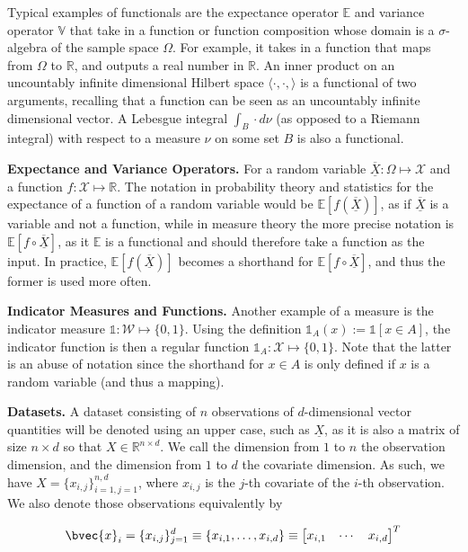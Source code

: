 \documentclass[twoside]{article} \usepackage{aistats2017}
\newcommand{\rv}[1]{\underline{\overline{#1}}}
\begin{document}
	Typical examples of functionals are the expectance operator $\mathbb{E}$ and variance operator $\mathbb{V}$ that take in a function or function composition whose domain is a $\sigma$-algebra of the sample space $\Omega$. For example, it takes in a function that maps from $\Omega$ to $\mathbb{R}$, and outputs a real number in $\mathbb{R}$. An inner product on an uncountably infinite dimensional Hilbert space $\langle \cdot, \cdot, \rangle$ is a functional of two arguments, recalling that a function can be seen as an uncountably infinite dimensional vector. A Lebesgue integral $\int_{B} \cdot d\nu$ (as opposed to a Riemann integral) with respect to a measure $\nu$ on some set $B$ is also a functional.
	
	\textbf{Expectance and Variance Operators.} For a random variable $\rv{X} : \Omega \mapsto \mathcal{X}$ and a function $f : \mathcal{X} \mapsto \mathbb{R}$. The notation in probability theory and statistics for the expectance of a function of a random variable would be $\mathbb{E}[f(\rv{X})]$, as if $\rv{X}$ is a variable and not a function, while in measure theory the more precise notation is $\mathbb{E}[f \circ \rv{X}]$, as it $\mathbb{E}$ is a functional and should therefore take a function as the input. In practice, $\mathbb{E}[f(\rv{X})]$ becomes a shorthand for $\mathbb{E}[f \circ \rv{X}]$, and thus the former is used more often.
	
	\textbf{Indicator Measures and Functions.} Another example of a measure is the indicator measure $\mathbb{1} : \mathcal{W} \mapsto \{0, 1\}$. Using the definition $\mathbb{1}_{A}(x) := \mathbb{1}[x \in A]$, the indicator function is then a regular function $\mathbb{1}_{A} : \mathcal{X} \mapsto \{0, 1\}$. Note that the latter is an abuse of notation since the shorthand for $x \in A$ is only defined if $x$ is a random variable (and thus a mapping). 
	
	\textbf{Datasets.} A dataset consisting of $n$ observations of $d$-dimensional vector quantities will be denoted using an upper case, such as $\underline{X}$, as it is also a matrix of size $n \times d$ so that $X \in \mathbb{R}^{n \times d}$. We call the dimension from $1$ to $n$ the observation dimension, and the dimension from $1$ to $d$ the covariate dimension. As such, we have $X = \{x_{i, j}\}_{i = 1, j = 1}^{n, d}$, where $x_{i, j}$ is the $j$-th covariate of the $i$-th observation. We also denote those observations equivalently by

	\begin{equation}
	\bvec{x}_{i} = \{x_{i, j}\}_{j = 1}^{d} \equiv \{x_{i, 1}, \dots, x_{i, d}\} \equiv \begin{bmatrix}
	x_{i, 1} & \cdots & x_{i, d}
	\end{bmatrix}^{T}
	\label{eq:data_vector_notation}
	\end{equation}
	
\end{document}
